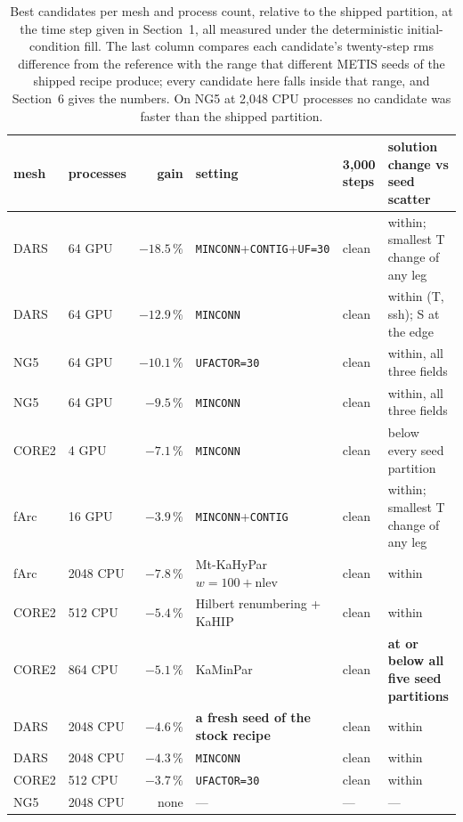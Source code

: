 \documentclass[11pt,a4paper]{article}
\newcommand{\minconn}{\texttt{MINCONN}}
\newcommand{\contig}{\texttt{CONTIG}}
\begin{document}
\begin{table}[h]\centering\scriptsize
\setlength{\tabcolsep}{3.2pt}
\begin{tabular}{llrlll}
\toprule
mesh & processes & gain & setting & 3{,}000 steps & solution change vs seed scatter \\
\midrule
DARS  & 64 GPU   & $\mathbf{-18.5\,\%}$ & \minconn+\contig+\texttt{UF=30} & clean & within; smallest T change of any leg \\
DARS  & 64 GPU   & $\mathbf{-12.9\,\%}$ & \minconn            & clean & within (T, ssh); S at the edge \\
NG5   & 64 GPU   & $\mathbf{-10.1\,\%}$ & \texttt{UFACTOR=30} & clean & within, all three fields \\
NG5   & 64 GPU   & $\mathbf{-9.5\,\%}$  & \minconn            & clean & within, all three fields \\
CORE2 & 4 GPU     & $\mathbf{-7.1\,\%}$  & \minconn            & clean & below every seed partition \\
fArc  & 16 GPU   & $-3.9\,\%$           & \minconn+\contig    & clean & within; smallest T change of any leg \\
\midrule
fArc  & 2048 CPU & $\mathbf{-7.8\,\%}$  & Mt-KaHyPar $w{=}100{+}\mathrm{nlev}$ & clean & within \\
CORE2 & 512 CPU  & $\mathbf{-5.4\,\%}$  & Hilbert renumbering + KaHIP & clean & within \\
CORE2 & 864 CPU  & $\mathbf{-5.1\,\%}$  & KaMinPar             & clean & \textbf{at or below all five seed partitions} \\
DARS  & 2048 CPU & $\mathbf{-4.6\,\%}$  & \textbf{a fresh seed of the stock recipe} & clean & within \\
DARS  & 2048 CPU & $-4.3\,\%$           & \minconn             & clean & within \\
CORE2 & 512 CPU  & $-3.7\,\%$           & \texttt{UFACTOR=30} & clean & within \\
NG5   & 2048 CPU & none                 & ---                  & --- & --- \\
\bottomrule
\end{tabular}
\caption{\small Best candidates per mesh and process count, relative to the shipped partition,
at the time step given in Section~1, all measured under the deterministic
initial-condition fill. The last column compares each candidate's twenty-step rms difference
from the reference with the range that different METIS seeds of the shipped recipe produce;
every candidate here falls inside that range, and Section~6 gives the numbers. On NG5 at
2{,}048 CPU processes no candidate was faster than the shipped partition.}
\label{tab:board}
\end{table}
\end{document}
